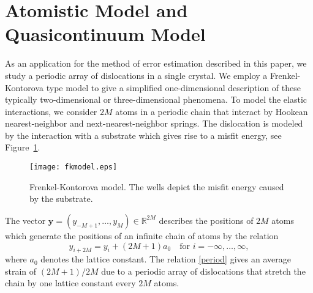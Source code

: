 \documentclass[11pt,reqno,oneside]{amsart}
\numberwithin{equation}{section}
\begin{document}
        

\section{Atomistic Model and Quasicontinuum Model}  \label{SecModel}

As an application for the method of error estimation described in
this paper, we study a periodic array of dislocations in a single
crystal. We employ a Frenkel-Kontorova type model
\cite{Marder:2000} to give a simplified one-dimensional
description of these typically two-dimensional or
three-dimensional phenomena. To model the elastic interactions, we
consider $2M$ atoms in a periodic chain that interact by Hookean
nearest-neighbor and next-nearest-neighbor springs.  The
dislocation is modeled by the interaction with a substrate which
gives rise to a misfit energy, see Figure~\ref{FigFKModel}.

\begin{figure}
\texttt{[image: fkmodel.eps]}
\caption{Frenkel-Kontorova model. The wells depict the misfit
energy caused by the substrate.}
\label{FigFKModel}
\end{figure}

The vector ${\mathbf{y}} = (y_{-M+1},\dots, y_M)\in{{\mathbb R}}^{2M}$
describes the positions of $2M$ atoms
which generate the positions of
an infinite chain of atoms by the relation
\begin{equation}\label{period}
y_{i+2M}=y_i+(2M+1)a_0\quad\text{for }i=-\infty,\dots,\infty,
\end{equation}
where $a_0$ denotes the lattice constant.  The relation
\eqref{period} gives an average strain of $(2M+1)/2M$ due to
a periodic array of dislocations that stretch the chain by
one lattice constant every $2M$ atoms.
\end{document}
